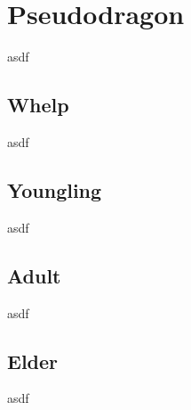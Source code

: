 \section{Pseudodragon}

asdf

\subsection{Whelp}

asdf

\subsection{Youngling}

asdf

\subsection{Adult}

asdf

\subsection{Elder}

asdf